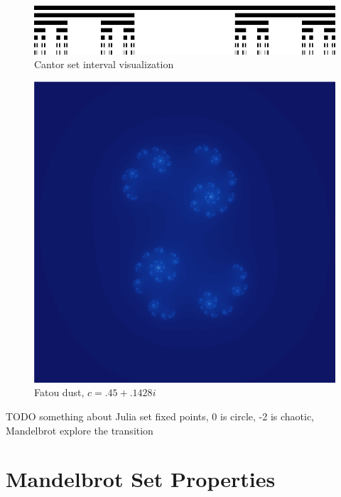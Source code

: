 \documentclass{article}
\begin{document}
\begin{figure}[!h]
    \includegraphics[width=\linewidth]{images/Cantor_set_in_seven_iterations.png}
    \caption{Cantor set interval visualization \cite{Cantor}}%
\end{figure}

\begin{figure}[!htbp]
    \centering
    \includegraphics[width=.4\linewidth]{images/julia_fatou_dust_c_45_1428.png}
    \caption{Fatou dust, $c = .45 + .1428i$}%
\end{figure}

 

TODO something about Julia set fixed points, 0 is circle, -2 is chaotic, Mandelbrot explore the transition

 
\section{Mandelbrot Set Properties}
\end{document}
